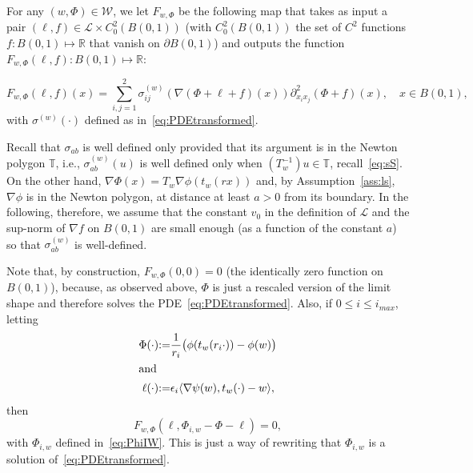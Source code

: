 \documentclass[AHL,Unicode,longabstracts,published]{cedram}
\newcommand{\R}{\mathbb{R}}
\newcommand{\bbT}{\mathbb{T}}
\newcommand{\clL}{\mathcal{L}}
\newcommand{\clW}{\mathcal{W}}
\newcommand{\eps}{\epsilon}
\begin{document}
\begin{defi}
For any $(w, \Phi)\in \clW$, we let $ F_{w, \Phi}$ be the following map that takes as input a pair $(\ell,f)\in\clL\times C^2_0(B(0,1)) $ (with $C^2_0(B(0,1))$ the set of $C^2$ functions $f:B(0,1)\mapsto \R$ that vanish on $\partial B(0,1)$) and outputs the function $F_{w,\Phi}(\ell,f):B(0,1)\mapsto \R$:

\begin{equation}\label{riva}
F_{w,\Phi}(\ell,f)(x)= \sum_{i,j=1}^2 \sigma^{(w)}_{ij}(\nabla(\Phi+\ell+f)(x))\partial^2_{x_i x_j}(\Phi+f)(x), \quad x\in B(0,1),
\end{equation}
with $\sigma^{(w)}(\cdot)$ defined as in~\eqref{eq:PDEtransformed}.
\end{defi}
\begin{rema}\label{rem:r0}
Recall that $\sigma_{ab}$ is well defined only provided that its argument is in the Newton polygon $\bbT$, i.e., $\sigma_{ab}^{(w)}(u)$ is well defined only when $(T_w^{-1})u\in\bbT $, recall~\eqref{eq:sS}. On the other hand, $\nabla \Phi (x)=T_w \nabla \phi(t_w(r x))$ and, by Assumption~\ref{ass:ls}, $\nabla\phi$ is in the Newton polygon, at distance at least $a>0$ from its boundary. In the following, therefore, we assume that the constant $v_0$ in the definition of $\clL$ and the sup-norm of $\nabla f$ on $B(0,1)$ are small enough (as a function of the constant $a$) so that $\sigma_{ab}^{(w)}$ is well-defined.
\end{rema}


\begin{rema}\label{rem:ms}
Note that, by construction, $F_{w,\Phi}(0,0)=0$ (the identically zero function on $B(0,1)$), because, as observed above, $\Phi$ is just a rescaled version of the limit shape and therefore solves the PDE~\eqref{eq:PDEtransformed}. Also, if $0\le i\le i_{max}$, letting
\begin{align}
\Phi(\cdot) &{:=}\frac1{r_i}\big(\phi(t_w(r_i\cdot))-\phi(w)\big)\label{eq:wayofre}
\\
\intertext{and}
\ell(\cdot) &{:=} \eps_i \langle \nabla \psi(w), t_w(\cdot)-w \rangle,\label{ltw}
\end{align}
then
\begin{equation}
F_{w, \Phi}(\ell, \Phi_{i,w} -
\Phi-\ell) = 0,
\end{equation}
with $\Phi_{i,w}$ defined in~\eqref{eq:PhiIW}. This is just a way of rewriting that $\Phi_{i,w}$ is a solution of~\eqref{eq:PDEtransformed}.
\end{rema}
\end{document}
